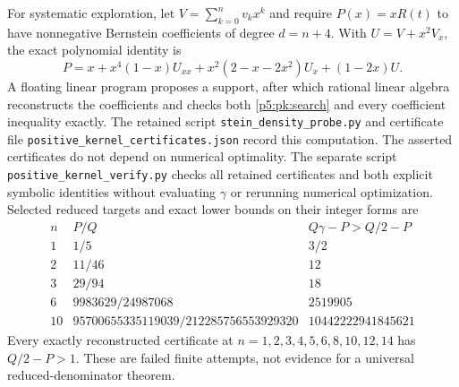 \documentclass[11pt,a4paper]{article}
\theoremstyle{definition}
\theoremstyle{remark}
\numberwithin{equation}{section}
\begin{document}
For systematic exploration, let $V=\sum_{k=0}^n v_kx^k$ and require
$P(x)=xR(t)$ to have nonnegative Bernstein coefficients of degree
$d=n+4$. With $U=V+x^2V_x$, the exact polynomial identity is
\begin{equation}
 P=x+x^4(1-x)U_{xx}+x^2(2-x-2x^2)U_x+(1-2x)U.\label{p5:pk:search}
\end{equation}
A floating linear program proposes a support, after which rational
linear algebra reconstructs the coefficients and checks both
\eqref{p5:pk:search} and every coefficient inequality exactly. The retained
script \texttt{stein\_density\_probe.py} and certificate file
\texttt{positive\_kernel\_certificates.json} record this computation.
The asserted certificates do not depend on numerical optimality.
The separate script \texttt{positive\_kernel\_verify.py} checks all retained
certificates and both explicit symbolic identities without evaluating
$\gamma$ or rerunning numerical optimization.
Selected reduced targets and exact lower bounds on their integer forms
are
\[
\begin{array}{c|c|c}
 n&P/Q&Q\gamma-P>Q/2-P\\\hline
 1&1/5&3/2\\
 2&11/46&12\\
 3&29/94&18\\
 6&9983629/24987068&2519905\\
 10&95700655335119039/212285756553929320&10442222941845621
\end{array}
\]
Every exactly reconstructed certificate at
$n=1,2,3,4,5,6,8,10,12,14$ has $Q/2-P>1$.
These are failed finite attempts, not evidence for a universal
reduced-denominator theorem.
\end{document}
